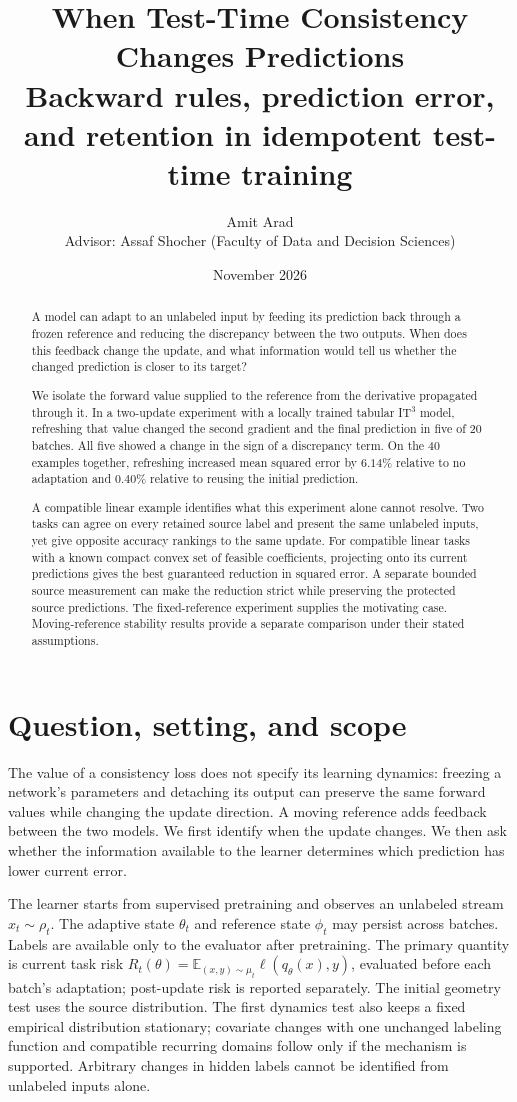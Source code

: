 \documentclass[11pt,a4paper]{article}
\title{When Test-Time Consistency Changes Predictions\\[0.4em]
\large Backward rules, prediction error, and retention in idempotent test-time training}
\author{Amit Arad\\[0.3em]
\small Advisor: Assaf Shocher (Faculty of Data and Decision Sciences)}
\date{November 2026}
\newcommand{\E}{\mathbb{E}}
\begin{document}
\maketitle
\begin{abstract}
A model can adapt to an unlabeled input by feeding its prediction back
through a frozen reference and reducing the discrepancy between the two
outputs. When does this feedback change the update, and what information
would tell us whether the changed prediction is closer to its target?

We isolate the forward value supplied to the reference from the derivative
propagated through it. In a two-update experiment with a locally trained
tabular IT$^3$ model, refreshing that value changed the second gradient and
the final prediction in five of 20 batches. All five showed a change in
the sign of a discrepancy term. On the 40 examples together, refreshing
increased mean squared error by $6.14\%$ relative to no adaptation and
$0.40\%$ relative to reusing the initial prediction.

A compatible linear example identifies what this experiment alone cannot
resolve. Two tasks can agree on every retained source label and present
the same unlabeled inputs, yet give opposite accuracy rankings to the
same update. For compatible linear tasks with a known compact convex set of feasible
coefficients, projecting onto its current predictions gives the best
guaranteed reduction in squared error. A separate bounded source
measurement can make the reduction strict while preserving the protected
source predictions. The fixed-reference
experiment supplies the motivating case. Moving-reference stability
results provide a separate comparison under their stated assumptions.
\end{abstract}

\section{Question, setting, and scope}
The value of a consistency loss does not specify its learning dynamics:
freezing a network's parameters and detaching its output can preserve the
same forward values while changing the update direction. A moving reference
adds feedback between the two models. We first identify when the update
changes. We then ask whether the information available to the learner
determines which prediction has lower current error.

The learner starts from supervised pretraining and observes an unlabeled
stream $x_t\sim\rho_t$. The adaptive state $\theta_t$ and reference state
$\phi_t$ may persist across batches. Labels are available only to the
evaluator after pretraining. The primary quantity is current task risk
$R_t(\theta)=\E_{(x,y)\sim\mu_t}\ell(q_\theta(x),y)$, evaluated before each
batch's adaptation; post-update risk is reported separately. The initial geometry test uses the source distribution. The first dynamics
test also keeps a fixed empirical distribution stationary; covariate changes with one
unchanged labeling function and compatible recurring domains follow only
if the mechanism is supported. Arbitrary changes in hidden
labels cannot be identified from unlabeled inputs alone.
\end{document}
